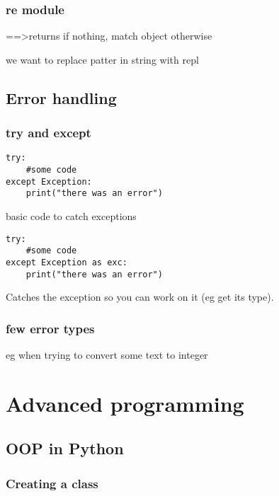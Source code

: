 		\subsubsection{re module}
		

			 ==>returns  if nothing, match object otherwise

			 we want to replace patter in string with repl

	
	
	\subsection{Error handling}

		\subsubsection{try and except}


\begin{lstlisting}
try:
    #some code
except Exception:
    print("there was an error")
\end{lstlisting}

			basic code to catch exceptions


\begin{lstlisting}
try:
    #some code
except Exception as exc:
    print("there was an error")
\end{lstlisting}

			Catches the exception so you can work on it (eg get its type).

		\subsubsection{few error types}

			 eg when trying to convert some text to integer



\section{Advanced programming}

	\subsection{OOP in Python}

		\subsubsection{Creating a class}


